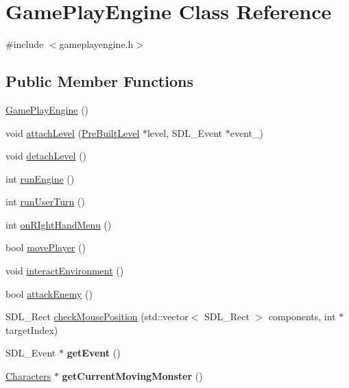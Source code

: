 \hypertarget{class_game_play_engine}{}\section{Game\+Play\+Engine Class Reference}
\label{class_game_play_engine}


{\ttfamily \#include $<$gameplayengine.\+h$>$}

\subsection*{Public Member Functions}
\begin{DoxyCompactItemize}
\item 
\hyperlink{class_game_play_engine_af4b9d34e0404f1eadec2de8050b35612}{Game\+Play\+Engine} ()
\item 
void \hyperlink{class_game_play_engine_a300998530f28b86679ced3b42b6ccf62}{attach\+Level} (\hyperlink{class_pre_built_level}{Pre\+Built\+Level} $\ast$level, S\+D\+L\+\_\+\+Event $\ast$event\+\_\+)
\item 
void \hyperlink{class_game_play_engine_a2b5f4dc886288daecaa2be9b9a8ca287}{detach\+Level} ()
\item 
int \hyperlink{class_game_play_engine_a5c155091580329513e92d395b11d4940}{run\+Engine} ()
\item 
int \hyperlink{class_game_play_engine_a80c31e7321cd07272b61291c27e31592}{run\+User\+Turn} ()
\item 
int \hyperlink{class_game_play_engine_a85db5a21ac09903aa84fc35378b273ea}{on\+R\+Ight\+Hand\+Menu} ()
\item 
bool \hyperlink{class_game_play_engine_a8f046d598bc155f3c6e6f534b7fdab5e}{move\+Player} ()
\item 
void \hyperlink{class_game_play_engine_a2a0f5663a43825bbd815d6bfe92bd8fb}{interact\+Environment} ()
\item 
bool \hyperlink{class_game_play_engine_a72d2da26054fde8cf0f801e6df871b82}{attack\+Enemy} ()
\item 
S\+D\+L\+\_\+\+Rect \hyperlink{class_game_play_engine_a2cbd6100775c2a55b46c4f3a29d166b1}{check\+Mouse\+Position} (std\+::vector$<$ S\+D\+L\+\_\+\+Rect $>$ components, int $\ast$target\+Index)
\item 
\hypertarget{class_game_play_engine_a97b44525869e4f5faada52d91b516e4e}{}\label{class_game_play_engine_a97b44525869e4f5faada52d91b516e4e} 
S\+D\+L\+\_\+\+Event $\ast$ {\bfseries get\+Event} ()
\item 
\hypertarget{class_game_play_engine_af5459723735dec06348f0d4f041735ef}{}\label{class_game_play_engine_af5459723735dec06348f0d4f041735ef} 
\hyperlink{class_characters}{Characters} $\ast$ {\bfseries get\+Current\+Moving\+Monster} ()
\end{DoxyCompactItemize}
